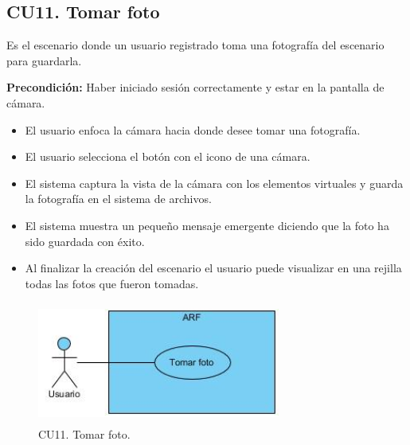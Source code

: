 \subsection{CU11. Tomar foto}\par
Es el escenario donde un usuario registrado toma una fotografía del escenario para guardarla.\par
\textbf{Precondición:} Haber iniciado sesión correctamente y estar en la pantalla de cámara.\par
\begin{itemize}
	\item El usuario enfoca la cámara hacia donde desee tomar una fotografía.
	\item El usuario selecciona el botón con el icono de una cámara.
	\item El sistema captura la vista de la cámara con los elementos virtuales y guarda la fotografía en el sistema de archivos.
	\item El sistema muestra un pequeño mensaje emergente diciendo que la foto ha sido guardada con éxito.
	\item Al finalizar la creación del escenario el usuario puede visualizar en una rejilla todas las fotos que fueron tomadas.
\end{itemize}

\begin{figure}[h!]
	\centering
	\includegraphics[width=8cm,height=4cm]{imagenes/analisis/cu/tomar_foto.jpg}
	\caption{CU11. Tomar foto.}
	\label{fig:tomarfoto}
\end{figure} 

